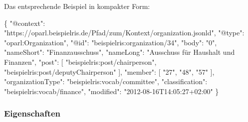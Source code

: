\documentclass[,a4paper]{article}
\newenvironment{Shaded}{}{}
\newcommand{\DataTypeTok}[1]{\textcolor[rgb]{0.56,0.13,0.00}{{#1}}}
\newcommand{\StringTok}[1]{\textcolor[rgb]{0.25,0.44,0.63}{{#1}}}
\newcommand{\OtherTok}[1]{\textcolor[rgb]{0.00,0.44,0.13}{{#1}}}
\newcommand{\FunctionTok}[1]{\textcolor[rgb]{0.02,0.16,0.49}{{#1}}}
\begin{document}
Das entsprechende Beispiel in kompakter Form:

\begin{Shaded}
\begin{Highlighting}[]
\FunctionTok{\{}
    \DataTypeTok{"@context"}\FunctionTok{:} \StringTok{"https://oparl.beispielris.de/Pfad/zum/Kontext/organization.jsonld"}\FunctionTok{,}
    \DataTypeTok{"@type"}\FunctionTok{:} \StringTok{"oparl:Organization"}\FunctionTok{,}
    \DataTypeTok{"@id"}\FunctionTok{:} \StringTok{"beispielris:organization/34"}\FunctionTok{,}
    \DataTypeTok{"body"}\FunctionTok{:} \StringTok{"0"}\FunctionTok{,}
    \DataTypeTok{"nameShort"}\FunctionTok{:} \StringTok{"Finanzausschuss"}\FunctionTok{,}
    \DataTypeTok{"nameLong"}\FunctionTok{:} \StringTok{"Ausschuss für Haushalt und Finanzen"}\FunctionTok{,}
    \DataTypeTok{"post"}\FunctionTok{:} \OtherTok{[}
        \StringTok{"beispielris:post/chairperson"}\OtherTok{,}
        \StringTok{"beispielris:post/deputyChairperson"}
    \OtherTok{]}\FunctionTok{,}
    \DataTypeTok{"member"}\FunctionTok{:} \OtherTok{[}
        \StringTok{"27"}\OtherTok{,}
        \StringTok{"48"}\OtherTok{,}
        \StringTok{"57"}
    \OtherTok{]}\FunctionTok{,}
    \DataTypeTok{"organizationType"}\FunctionTok{:} \StringTok{"beispielris:vocab/committee"}\FunctionTok{,}
    \DataTypeTok{"classification"}\FunctionTok{:} \StringTok{"beispielris:vocab/finance"}\FunctionTok{,}
    \DataTypeTok{"modified"}\FunctionTok{:} \StringTok{"2012-08-16T14:05:27+02:00"}
\FunctionTok{\}}
\end{Highlighting}
\end{Shaded}

\subsubsection{Eigenschaften}\label{eigenschaften-2}
\end{document}
